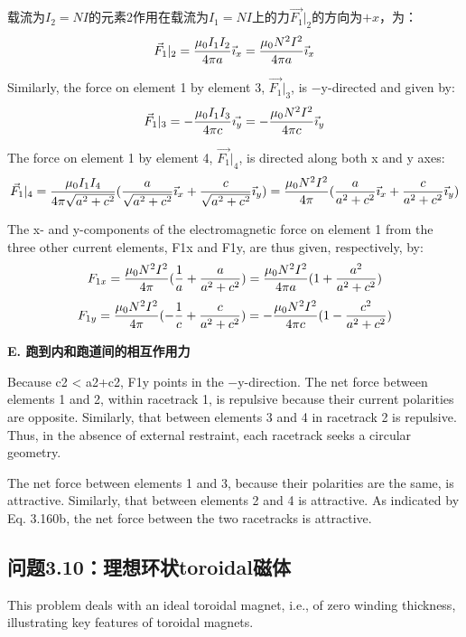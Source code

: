 载流为$I_2=NI$的元素2作用在载流为$I_1=NI$上的力$\vec{F_1}|_2$的方向为$+x$，为：
$$
\vec{F}_{1}|_{2}=\frac{\mu_{0}I_{1}I_{2}}{4\pi a}\vec{\imath}_{x}=\frac{\mu_{0}N^{2}I^{2}}{4\pi a}\vec{\imath}_{x}\\%
$$

Similarly, the force on element 1 by element 3, $\vec{F_1}|_3$, is −y-directed and given by:
$$
\vec{F}_{1}|_{3}=-\frac{\mu_{0}I_{1}I_{3}}{4\pi c}\vec{\imath_{y}}=-\frac{\mu_{0}N^{2}I^{2}}{4\pi c}\vec{\imath}_{y}\\%
$$

The force on element 1 by element 4, $\vec{F_1}|_4$, is directed along both x and y axes:
$$
\vec{F}_{1}|_{4}=\frac{\mu_{0}I_{1}I_{4}}{4\pi\sqrt{a^{2}+c^{2}}}(\frac{a}{\sqrt{a^{2}+c^{2}}}\vec{\imath}_{x}+\frac{c}{\sqrt{a^{2}+c^{2}}}\vec{\imath}_{y})\\
=\frac{\mu_{0}N^{2}I^{2}}{4\pi}(\frac{a}{a^{2}+c^{2}}\vec{\imath}_{x}+\frac{c}{a^{2}+c^{2}}\vec{\imath}_{y})\\%
$$

The x- and y-components of the electromagnetic force on element 1 from the three
other current elements, F1x and F1y, are thus given, respectively, by:
$$
F_{1x}=\frac{\mu_{0}N^{2}I^{2}}{4\pi}(\frac{1}{a}+\frac{a}{a^{2}+c^{2}})=\frac{\mu_{0}N^{2}I^{2}}{4\pi a}(1+\frac{a^{2}}{a^{2}+c^{2}})\\%
$$
$$
F_{1y}=\frac{\mu_{0}N^{2}I^{2}}{4\pi}(-\frac{1}{c}+\frac{c}{a^{2}+c^{2}})=-\frac{\mu_{0}N^{2}I^{2}}{4\pi c}(1-\frac{c^{2}}{a^{2}+c^{2}})\\%
$$

\textbf{E. 跑到内和跑道间的相互作用力}

Because c2 < a2+c2, F1y points in the −y-direction. The net force between elements 1 and 2, within racetrack 1, is repulsive because their current polarities
are opposite. Similarly, that between elements 3 and 4 in racetrack 2 is repulsive.
Thus, in the absence of external restraint, each racetrack seeks a circular geometry.

The net force between elements 1 and 3, because their polarities are the same, is
attractive. Similarly, that between elements 2 and 4 is attractive. As indicated by
Eq. 3.160b, the net force between the two racetracks is attractive.

\newpage


\subsection{问题3.10：理想环状toroidal磁体}
This problem deals with an ideal toroidal magnet, i.e., of zero winding thickness,
illustrating key features of toroidal magnets.

